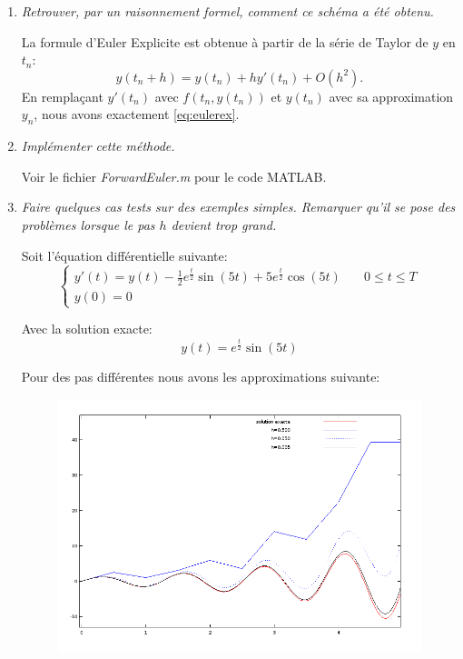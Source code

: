 \documentclass[a4paper,10pt]{article}
\begin{document}
\begin{enumerate}
    \item \emph{Retrouver, par un raisonnement formel, comment ce schéma a été
    obtenu.}

    La formule d'Euler Explicite est obtenue à partir de la série de Taylor de $y$
    en $t_n$:
\[
    y(t_n + h) = y(t_n) + hy'(t_n) + O(h^2).
\]
    En remplaçant $y'(t_n)$ avec $f(t_n, y(t_n))$ et $y(t_n)$ avec sa approximation
    $y_n$, nous avons exactement \eqref{eq:eulerex}.

    \item \emph{Implémenter cette méthode.}

    Voir le fichier \emph{ForwardEuler.m} pour le code MATLAB.

    \item \emph{Faire quelques cas tests sur des exemples simples. Remarquer qu'il se
    pose des problèmes lorsque le pas $h$ devient trop grand.}

    Soit l'équation différentielle suivante:
\begin{equation}\label{eq:eq1}
\left\{
\begin{array}{ll}
    y'(t) = y(t) - \frac{1}{2} e^{\frac{t}{2}} \sin(5t) + 5 e^{\frac{t}{2}} \cos(5t)
    & \quad 0 \leq t \leq T \\
    y(0) = 0
\end{array}
\right.
\end{equation}

    Avec la solution exacte:
\[
    y(t) = e^{\frac{t}{2}} \sin(5t)
\]

    Pour des pas différentes nous avons les approximations suivante:
\begin{figure}[h!]
    \centering
    \includegraphics[scale=0.7]{./img/step-forward-euler.png}
\end{figure}


\end{enumerate}
\end{document}
